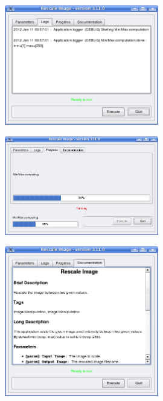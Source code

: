 \begin{figure}[h]
  \center
  \includegraphics[width=0.6\textwidth]{../Art/QtImages/rescale_logs.png}
  \label{fig:rescaleLogs}
\end{figure}

\begin{figure}[h]
  \center
  \includegraphics[width=0.6\textwidth]{../Art/QtImages/rescale_progress.png}
  \label{fig:rescaleProgress}
\end{figure}

\begin{figure}[h]
  \center
  \includegraphics[width=0.6\textwidth]{../Art/QtImages/rescale_documentation.png}
  \label{fig:rescaleDocumentation}
\end{figure}

